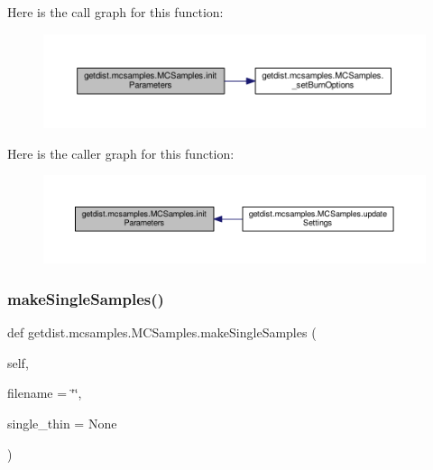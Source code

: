 Here is the call graph for this function\+:
\nopagebreak
\begin{figure}[H]
\begin{center}
\leavevmode
\includegraphics[width=350pt]{classgetdist_1_1mcsamples_1_1MCSamples_af5783ec0e78ebfceda4c0af135407236_cgraph}
\end{center}
\end{figure}
Here is the caller graph for this function\+:
\nopagebreak
\begin{figure}[H]
\begin{center}
\leavevmode
\includegraphics[width=350pt]{classgetdist_1_1mcsamples_1_1MCSamples_af5783ec0e78ebfceda4c0af135407236_icgraph}
\end{center}
\end{figure}
\mbox{\label{classgetdist_1_1mcsamples_1_1MCSamples_af99f9e955d6d0b21766aae9e7bb9c17f}} 
\subsubsection{\texorpdfstring{make\+Single\+Samples()}{makeSingleSamples()}}
{\footnotesize\ttfamily def getdist.\+mcsamples.\+M\+C\+Samples.\+make\+Single\+Samples (\begin{DoxyParamCaption}\item[{}]{self,  }\item[{}]{filename = {\ttfamily \char`\"{}\char`\"{}},  }\item[{}]{single\+\_\+thin = {\ttfamily None} }\end{DoxyParamCaption})}

